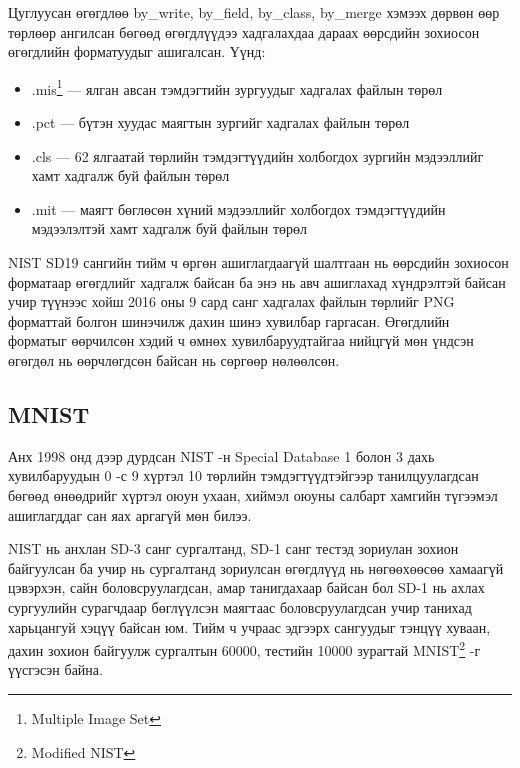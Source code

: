 Цуглуусан өгөгдлөө by\_write, by\_field, by\_class, by\_merge хэмээх дөрвөн өөр төрлөөр ангилсан бөгөөд өгөгдлүүдээ хадгалахдаа дараах өөрсдийн зохиосон өгөгдлийн форматуудыг ашигалсан. Үүнд:
\begin{itemize}
	\item .mis\footnote{Multiple Image Set} --- ялган авсан тэмдэгтийн зургуудыг хадгалах файлын төрөл
	\item .pct --- бүтэн хуудас маягтын зургийг хадгалах файлын төрөл
	\item .cls --- 62 ялгаатай төрлийн тэмдэгтүүдийн холбогдох зургийн мэдээллийг хамт хадгалж буй файлын төрөл
	\item .mit --- маягт бөглөсөн хүний мэдээллийг холбогдох тэмдэгтүүдийн мэдээлэлтэй хамт хадгалж буй файлын төрөл
\end{itemize}

NIST SD19 сангийн тийм ч өргөн ашиглагдаагүй шалтгаан нь өөрсдийн зохиосон форматаар өгөгдлийг хадгалж байсан ба энэ нь авч ашиглахад хүндрэлтэй байсан учир түүнээс хойш 2016 оны 9 сард санг хадгалах файлын төрлийг PNG форматтай болгон шинэчилж дахин шинэ хувилбар гаргасан. Өгөгдлийн форматыг өөрчилсөн хэдий ч өмнөх хувилбаруудтайгаа нийцгүй мөн үндсэн өгөгдөл нь өөрчлөгдсөн байсан нь сөргөөр нөлөөлсөн.

\subsection{MNIST \cite{mnist}}

Анх 1998 онд дээр дурдсан NIST -н Special Database 1 болон 3 дахь хувилбаруудын 0 -с 9 хүртэл 10 төрлийн тэмдэгтүүдтэйгээр танилцуулагдсан бөгөөд өнөөдрийг хүртэл оюун ухаан, хиймэл оюуны салбарт хамгийн түгээмэл ашиглагддаг сан яах аргагүй мөн билээ.

NIST нь анхлан SD-3 санг сургалтанд, SD-1 санг тестэд зориулан зохион байгуулсан ба учир нь сургалтанд зориулсан өгөгдлүүд нь нөгөөхөөсөө хамаагүй цэвэрхэн, сайн боловсруулагдсан, амар танигдахаар байсан бол SD-1 нь ахлах сургуулийн сурагчдаар бөглүүлсэн маягтаас боловсруулагдсан учир танихад харьцангуй хэцүү байсан юм. Тийм ч учраас эдгээрх сангуудыг тэнцүү хуваан, дахин зохион байгуулж сургалтын 60000, тестийн 10000 зурагтай MNIST\footnote{Modified NIST} -г үүсгэсэн байна.\cite{mnist-paper}


